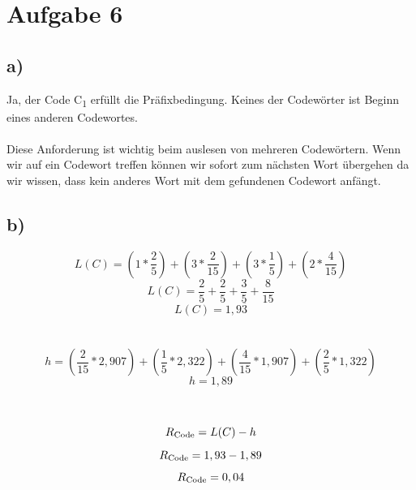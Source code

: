 \documentclass[a4paper,12pt]{scrartcl}
\begin{document}
\section{Aufgabe 6}
\subsection{a)}
Ja, der Code C\textsubscript{1} erfüllt die Präfixbedingung. Keines der Codewörter ist Beginn eines anderen Codewortes.
\\\\
Diese Anforderung ist wichtig beim auslesen von mehreren Codewörtern. Wenn wir auf ein Codewort treffen können wir sofort zum nächsten Wort  übergehen da wir wissen, dass kein anderes Wort mit dem gefundenen Codewort anfängt.

\subsection{b)}
\begin{displaymath}
L(C) = (1*\frac{2} {5})+(3*\frac{2} {15})+(3*\frac{1} {5})+(2*\frac{4} {15})
\end{displaymath}
\begin{displaymath}
L(C) = \frac{2} {5} + \frac{2} {5} + \frac{3} {5} + \frac{8} {15}
\end{displaymath}
\begin{displaymath}
L(C) = 1,9\overline{3}
\end{displaymath}
\\\\
\begin{displaymath}
h = (\frac{2} {15}*2,907)+(\frac{1} {5}*2,322)+(\frac{4} {15}*1,907)+(\frac{2} {5}*1,322)
\end{displaymath}
\begin{displaymath}
h = 1,89
\end{displaymath}
\\\\
\begin{displaymath}
R\textsubscript{Code} = L(C) - h
\end{displaymath}
\begin{displaymath}
R\textsubscript{Code} = 1,93 - 1,89
\end{displaymath}
\begin{displaymath}
R\textsubscript{Code} = 0,04
\end{displaymath}
\end{document}
